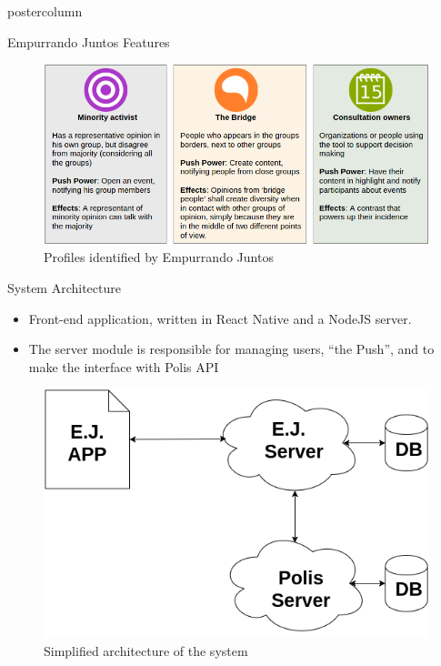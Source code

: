 \documentclass[final,hyperref={pdfpagelabels=false}]{beamer}
\begin{document}
\begin{frame}
\begin{columns}
\begin{column}{.49\textwidth}
\begin{beamercolorbox}[center,wd=\textwidth]{postercolumn}
\begin{minipage}[T]{.95\textwidth}
{\begin{block}{Empurrando Juntos Features}
\begin{itemize}
    \begin{figure}
      \begin{center}
        \includegraphics[scale=1.4]{../images/userprofiles.png}
        \caption{Profiles identified by Empurrando Juntos}
        \label{fig:user-profiles}
      \end{center}
    \end{figure}
  \end{itemize}
\end{block}

\begin{block}{System Architecture}
	\begin{itemize}
    \item Front-end application, written in React Native
    and a NodeJS server.

    \item The server module is responsible for managing users, ``the Push'', and
    to make the interface with Polis API
  \end{itemize}

  \begin{figure}
    \begin{center}
      \includegraphics[scale=1.3]{../images/polis4.png}
      \caption{Simplified architecture of the system}
      \label{fig:architecture}
    \end{center}
  \end{figure}
\end{block}

}
\end{minipage}
\end{beamercolorbox}
\end{column}
\end{columns}
\end{frame}
\end{document}

